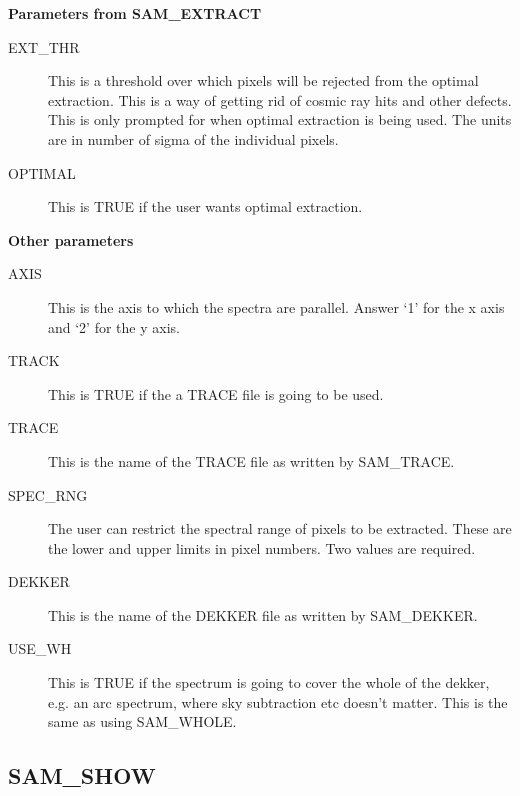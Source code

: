 {\bf Parameters from SAM\_EXTRACT}

\begin{description}
\begin{description}

\item[EXT\_THR] This is a threshold over which pixels will be rejected from the
optimal extraction.  This is a way of getting rid of cosmic ray hits and other
defects.  This is only prompted for when optimal extraction is being used.  The
units are in number of sigma of the individual pixels.

\item[OPTIMAL]  This is TRUE if the user wants optimal extraction.

\end{description}
\end{description}

{\bf Other parameters}

\begin{description}
\begin{description}

\item[AXIS] This is the axis to which the spectra are parallel.  Answer `1' for
the x axis and `2' for the y axis.

\item[TRACK] This is TRUE if the a TRACE file is going to be used.

\item[TRACE] This is the name of the TRACE file as written by SAM\_TRACE.

\item[SPEC\_RNG] The user can restrict the spectral range of pixels to be
extracted. These are the lower and upper limits in pixel numbers.  Two values
are required.

\item[DEKKER] This is the name of the DEKKER file as written by SAM\_DEKKER.

\item[USE\_WH] This is TRUE if the spectrum is going to cover the whole of the
dekker, e.g. an arc spectrum, where sky subtraction etc doesn't matter.  This
is the same as using SAM\_WHOLE.

\end{description}
\end{description}

\subsection{SAM\_SHOW}

